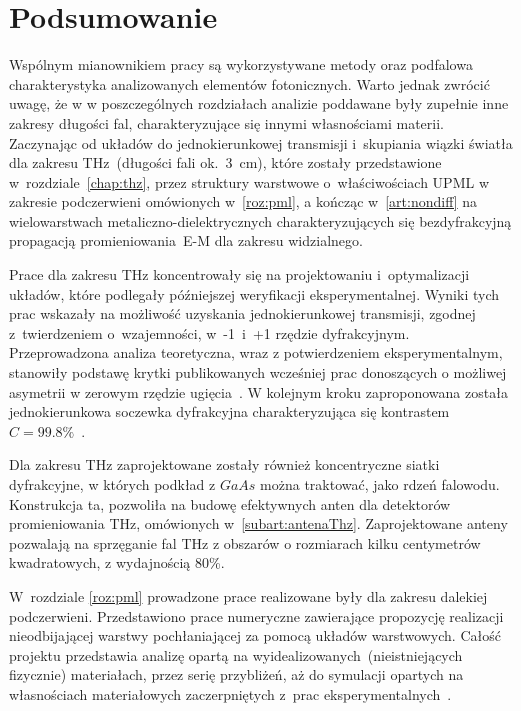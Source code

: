 \chapter{Podsumowanie}
Wspólnym mianownikiem pracy są wykorzystywane metody oraz podfalowa charakterystyka analizowanych elementów fotonicznych. Warto jednak zwrócić uwagę, że w w poszczególnych rozdziałach analizie poddawane były zupełnie inne zakresy długości fal, charakteryzujące się innymi własnościami materii. Zaczynając od układów do jednokierunkowej transmisji i~skupiania wiązki światła dla zakresu THz~(długości fali ok.~3~cm), które zostały przedstawione w~rozdziale~\ref{chap:thz}, przez struktury warstwowe o~właściwościach UPML w zakresie podczerwieni omówionych w~\ref{roz:pml}, a kończąc w~\ref{art:nondiff} na wielowarstwach metaliczno-dielektrycznych charakteryzujących się bezdyfrakcyjną propagacją promieniowania~E-M dla zakresu widzialnego.

Prace dla zakresu THz koncentrowały się na projektowaniu i~optymalizacji układów, które podlegały późniejszej weryfikacji eksperymentalnej. Wyniki tych prac wskazały na możliwość uzyskania jednokierunkowej transmisji, zgodnej z~twierdzeniem o~wzajemności, w~-1~i~+1 rzędzie dyfrakcyjnym. Przeprowadzona analiza teoretyczna, wraz z potwierdzeniem eksperymentalnym, stanowiły podstawę krytki publikowanych wcześniej prac donoszących o możliwej asymetrii w zerowym rzędzie ugięcia~\cite{Stolarek:13}. W kolejnym kroku zaproponowana została jednokierunkowa soczewka dyfrakcyjna charakteryzująca się kontrastem $C=99.8\%$~\cite{Yavorskiy:14}. 

Dla zakresu THz zaprojektowane zostały również koncentryczne siatki dyfrakcyjne, w których podkład z $GaAs$ można traktować, jako rdzeń falowodu. Konstrukcja ta, pozwoliła na budowę efektywnych anten dla detektorów promieniowania THz, omówionych w~\ref{subart:antenaThz}. Zaprojektowane anteny pozwalają na sprzęganie fal THz z obszarów o rozmiarach kilku centymetrów kwadratowych, z wydajnością  80\%.

W~rozdziale \ref{roz:pml} prowadzone prace realizowane były dla zakresu dalekiej podczerwieni. Przedstawiono prace numeryczne zawierające propozycję realizacji nieodbijającej warstwy pochłaniającej za pomocą układów warstwowych. Całość projektu przedstawia analizę opartą na wyidealizowanych~(nieistniejących fizycznie) materiałach, przez serię przybliżeń, aż do symulacji opartych na własnościach materiałowych zaczerpniętych z~prac eksperymentalnych~\cite{ania2015,stefaniuk2015perfectly}.

